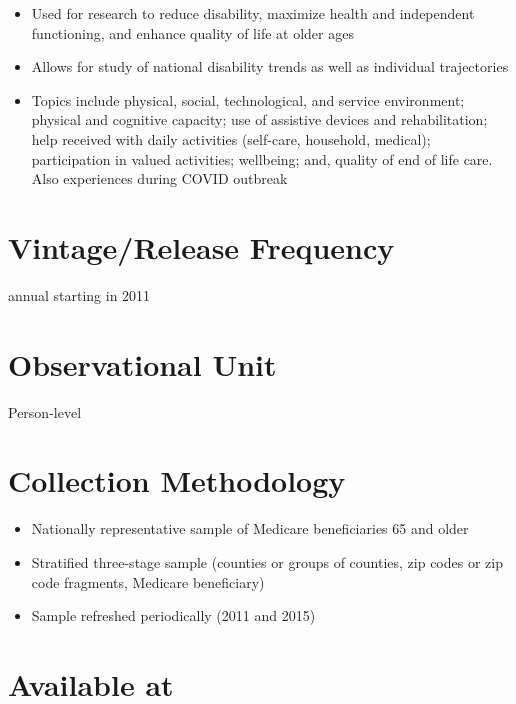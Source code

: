 \documentclass[
]{book}
\providecommand{\tightlist}{%
  \setlength{\itemsep}{0pt}\setlength{\parskip}{0pt}}
\begin{document}
\begin{itemize}
\tightlist
\item
  Used for research to reduce disability, maximize health and independent functioning, and enhance quality of life at older ages
\item
  Allows for study of national disability trends as well as individual trajectories
\item
  Topics include physical, social, technological, and service environment; physical and cognitive capacity; use of assistive devices and rehabilitation; help received with daily activities (self-care, household, medical); participation in valued activities; wellbeing; and, quality of end of life care. Also experiences during COVID outbreak
\end{itemize}

\hypertarget{vintagerelease-frequency-49}{%
\section{Vintage/Release Frequency}\label{vintagerelease-frequency-49}}

annual starting in 2011

\hypertarget{observational-unit-49}{%
\section{Observational Unit}\label{observational-unit-49}}

Person-level

\hypertarget{collection-methodology-49}{%
\section{Collection Methodology}\label{collection-methodology-49}}

\begin{itemize}
\tightlist
\item
  Nationally representative sample of Medicare beneficiaries 65 and older
\item
  Stratified three-stage sample (counties or groups of counties, zip codes or zip code fragments, Medicare beneficiary)
\item
  Sample refreshed periodically (2011 and 2015)
\end{itemize}

\hypertarget{available-at-49}{%
\section{Available at}\label{available-at-49}}
\end{document}
